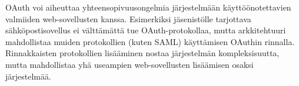 OAuth voi aiheuttaa yhteensopivuusongelmia järjestelmään käyttöönotettavien valmiiden web-sovellusten kanssa. Esimerkiksi jäsenistölle tarjottava sähköpostisovellus ei välttämättä tue OAuth-protokollaa, mutta arkkitehtuuri mahdollistaa muiden protokollien (kuten SAML) käyttämisen OAuthin rinnalla. Rinnakkaisten protokollien lisääminen nostaa järjestelmän kompleksisuutta, mutta mahdollistaa yhä useampien web-sovellusten lisäämisen osaksi järjestelmää.
